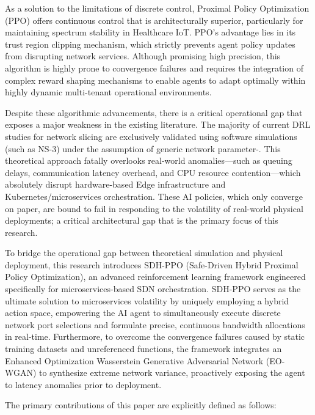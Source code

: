As a solution to the limitations of discrete control, Proximal Policy Optimization (PPO) offers continuous control that is architecturally superior, particularly for maintaining spectrum stability in Healthcare IoT\cite{b17}. PPO's advantage lies in its trust region clipping mechanism, which strictly prevents agent policy updates from disrupting network services. Although promising high precision, this algorithm is highly prone to convergence failures and requires the integration of complex reward shaping mechanisms to enable agents to adapt optimally within highly dynamic multi-tenant operational environments\cite{b18}.

Despite these algorithmic advancements, there is a critical operational gap that exposes a major weakness in the existing literature. The majority of current DRL studies for network slicing are exclusively validated using software simulations (such as NS-3) under the assumption of generic network parameter\cite{b15}-\cite{b20}. This theoretical approach fatally overlooks real-world anomalies---such as queuing delays, communication latency overhead, and CPU resource contention---which absolutely disrupt hardware-based Edge infrastructure and Kubernetes/microservices orchestration. These AI policies, which only converge on paper, are bound to fail in responding to the volatility of real-world physical deployments; a critical architectural gap that is the primary focus of this research.

To bridge the operational gap between theoretical simulation and physical deployment, this research introduces SDH-PPO (Safe-Driven Hybrid Proximal Policy Optimization), an advanced reinforcement learning framework engineered specifically for microservices-based SDN orchestration. SDH-PPO serves as the ultimate solution to microservices volatility by uniquely employing a hybrid action space, empowering the AI agent to simultaneously execute discrete network port selections and formulate precise, continuous bandwidth allocations in real-time. Furthermore, to overcome the convergence failures caused by static training datasets and unreferenced functions, the framework integrates an Enhanced Optimization Wasserstein Generative Adversarial Network (EO-WGAN) to synthesize extreme network variance, proactively exposing the agent to latency anomalies prior to deployment.

The primary contributions of this paper are explicitly defined as follows:

